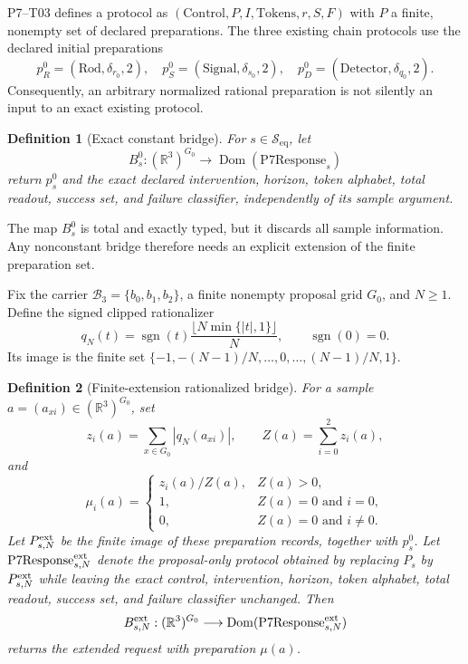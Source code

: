 \documentclass[11pt]{article}
\newtheorem{definition}{Definition}
\newcommand{\Seq}{\mathcal S_{\mathrm{eq}}}
\newcommand{\RR}{\mathbb R}
\newcommand{\Dom}{\operatorname{Dom}}
\begin{document}
P7--T03 defines a protocol as
\((\mathrm{Control},P,I,\mathrm{Tokens},r,S,F)\) with \(P\) a finite,
nonempty set of declared preparations.  The three existing chain protocols
use the declared initial preparations
\[
 p_R^0=(\mathrm{Rod},\delta_{r_0},2),\quad
 p_S^0=(\mathrm{Signal},\delta_{s_0},2),\quad
 p_D^0=(\mathrm{Detector},\delta_{q_0},2).
\]
Consequently, an arbitrary normalized rational preparation is not silently an
input to an exact existing protocol.

\begin{definition}[Exact constant bridge]
For \(s\in\Seq\), let
\[
 B_s^0:(\RR^3)^{G_0}\longrightarrow
 \Dom(\mathrm{P7Response}_s)
\]
return \(p_s^0\) and the exact declared intervention, horizon, token alphabet,
total readout, success set, and failure classifier, independently of its sample
argument.
\end{definition}

The map \(B_s^0\) is total and exactly typed, but it discards all sample
information.  Any nonconstant bridge therefore needs an explicit extension of
the finite preparation set.

Fix the carrier \(\mathcal B_3=\{b_0,b_1,b_2\}\), a finite nonempty proposal
grid \(G_0\), and \(N\ge1\).  Define the signed clipped rationalizer
\[
 q_N(t)=\operatorname{sgn}(t)
        \frac{\lfloor N\min\{|t|,1\}\rfloor}{N},
 \qquad \operatorname{sgn}(0)=0.
\]
Its image is the finite set
\(\{-1,-(N-1)/N,\ldots,0,\ldots,(N-1)/N,1\}\).

\begin{definition}[Finite-extension rationalized bridge]
For a sample \(a=(a_{xi})\in(\RR^3)^{G_0}\), set
\[
 z_i(a)=\sum_{x\in G_0}|q_N(a_{xi})|,
 \qquad Z(a)=\sum_{i=0}^2z_i(a),
\]
and
\[
 \mu_i(a)=
 \begin{cases}
 z_i(a)/Z(a),&Z(a)>0,\\
 1,&Z(a)=0\text{ and }i=0,\\
 0,&Z(a)=0\text{ and }i\ne0.
 \end{cases}
\]
Let \(P_{s,N}^{\rm ext}\) be the finite image of these preparation records,
together with \(p_s^0\).  Let \(\mathrm{P7Response}_{s,N}^{\rm ext}\) denote
the proposal-only protocol obtained by replacing \(P_s\) by
\(P_{s,N}^{\rm ext}\) while leaving the exact control, intervention, horizon,
token alphabet, total readout, success set, and failure classifier unchanged.
Then
\[
 B_{s,N}^{\rm ext}:(\RR^3)^{G_0}\longrightarrow
 \Dom(\mathrm{P7Response}_{s,N}^{\rm ext})
\]
returns the extended request with preparation \(\mu(a)\).
\end{definition}
\end{document}
